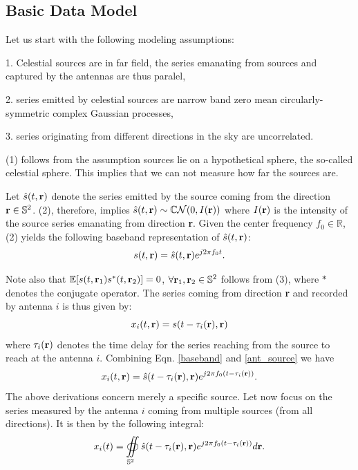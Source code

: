\documentclass{article}
\begin{document}
\subsection{Basic Data Model}

Let us start with the following modeling assumptions:~\cite{perley1999ra}

1. Celestial sources are in far field, the series emanating from sources and captured by the antennas are thus paralel,
  
2.  series emitted by celestial sources are narrow band zero mean circularly-symmetric complex Gaussian processes,
    
3.  series originating from different directions in the sky are uncorrelated.  
  
(1) follows from the assumption sources lie on a hypothetical sphere, the so-called celestial sphere. This implies that we can not measure how far the sources are.
 \vspace{3mm}
 
Let $\hat{s}(t,{\bf r})$ denote the series emitted by the source coming from the direction ${\bf r} \in \mathbb{S}^2$. (2), therefore, implies $\hat{s}(t,{\bf r}) \sim \mathbb{C}\mathcal{N}(0,I(\bf{r}))$ where $I(\bf{r})$ is the intensity of the source series emanating from direction {\bf r}. Given the center frequency $f_0 \in \mathbb{R}$, (2) yields the following baseband representation of $\hat{s}(t,{\bf r})$:
\begin{equation}
 s(t,{\bf r}) = \hat{s}(t,{\bf r})e^{j2\pi f_0t}.\label{baseband}
 \end{equation}
 
Note also that $\mathbb{E}[s(t,{\bf r}_1)s^*(t,{\bf r}_2)] =0$, $\forall {\bf r}_1, {\bf r}_2 \in \mathbb{S}^2$ follows from (3), where $*$ denotes the conjugate operator. 
The series coming from direction {\bf r} and recorded by antenna $i$ is thus given by:
\begin{equation}
x_i(t,{\bf r}) = s(t-\tau_{i}({\bf r}),{\bf r}) \label{ant_source}
\end{equation} 
 where $\tau_i({\bf r})$ denotes the time delay for the series reaching from the source to reach at the antenna $i$. Combining Eqn. \ref{baseband} and \ref{ant_source} we have
 \begin{equation}
 x_i(t,{\bf r}) = \hat{s}(t-\tau_{i}({\bf r}),{\bf r})e^{j2\pi f_0(t-\tau_{i}({\bf r}))}.
 \end{equation}
The above derivations concern merely a specific source. Let now focus on the series measured by the antenna $i$ coming from multiple sources (from all directions). It is then by the following integral:
\begin{equation}
x_i(t) = \oiint \displaylimits_{\mathbb{S}^2} \hat{s}(t-\tau_i({\bf r}), {\bf r})e^{j2\pi f_0(t-\tau_i({\bf r}))}d{\bf r}. \label{int_sour}
\end{equation}
 
\end{document}
